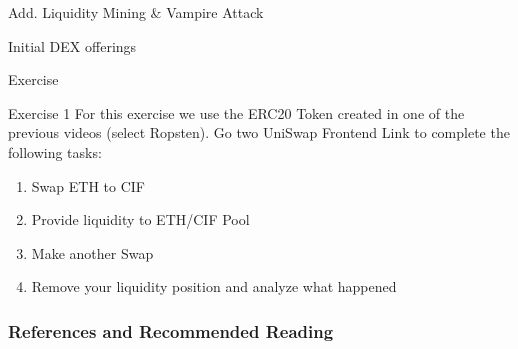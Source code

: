 \documentclass[]{beamer}
\begin{document}
\begin{frame}{Add. Liquidity Mining \& Vampire Attack}

\end{frame}


\begin{frame}{Initial DEX offerings}

\end{frame}


\begin{frame}{Exercise}
	\begin{exercise}{Exercise 1}
	For this exercise we use the ERC20 Token created in one of the previous videos (select Ropsten). Go two UniSwap Frontend Link to complete the following tasks:
	
		\begin{enumerate}
			\item Swap ETH to CIF
			\item Provide liquidity to ETH/CIF Pool
			\item Make another Swap
			\item Remove your liquidity position and analyze what happened
		\end{enumerate}
	\end{exercise}
\end{frame}



\begin{frame}%
\frametitle{References and Recommended Reading}
	
	
\end{frame}
\end{document}
